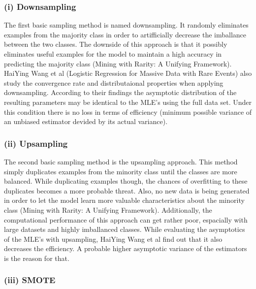 \documentclass[12pt,titlepage]{article}
\begin{document}
\subsubsection*{(i) Downsampling}

The first basic sampling method is named downsampling. It randomly eliminates examples from the majority class in order to artifficially decrease the imballance between the
two classes. The downside of this approach is that it possibly eliminates useful examples for the model to maintain a high accuracy in predicting the majority class 
(Mining with Rarity: A Unifying Framework). HaiYing Wang et al (Logistic Regression for Massive Data with Rare Events) also study the convergence rate and distributaional
properties when applying downsampling. According to their findings the asymptotic distribution of the resulting parameters may be identical to the MLE's using the full data set.
Under this condition there is no loss in terms of efficiency (minimum possible variance of an unbiased estimator devided by its actual variance). \\

\subsubsection*{(ii) Upsampling}

The second basic sampling method is the upsampling approach. This method simply duplicates examples from the minority class until the classes are more balanced.
While duplicating examples though, the chances of overfitting to these duplicates becomes a more probable threat.
Also, no new data is being generated in order to let the model learn more valuable characteristics about the minority class (Mining with Rarity: A Unifying Framework).
Additionally, the computational performance of this approach can get rather poor, espacially with large datasets and highly imballanced classes. While evaluating the
asymptotics of the MLE's with upsampling, HaiYing Wang et al find out that it also decreases the efficiency. A probable higher asymptotic variance of the estimators
is the reason for that. \\


\subsubsection*{(iii) SMOTE}
\end{document}
